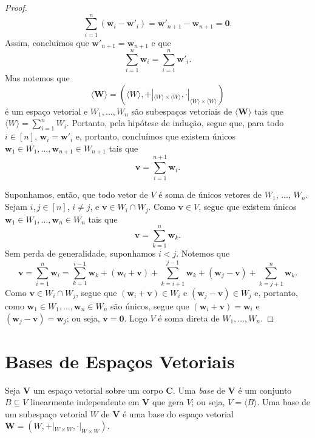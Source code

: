 \begin{proof}
\begin{equation*}
	\sum_{i=1}^n (\bm w_i - \bm w'_i) = \bm w'_{n+1} - \bm w_{n+1} = \bm 0.
	\end{equation*}
Assim, concluímos que $\bm w'_{n+1}=\bm w_{n+1}$ e que
	\begin{equation*}
	\sum_{i=1}^n \bm w_i = \sum_{i=1}^n \bm w'_i.
	\end{equation*}
Mas notemos que
	\begin{equation*}
	\bm{\langle W \rangle}=(\langle W \rangle,+|_{\langle W \rangle \times \langle W \rangle},\cdot|_{\langle W \rangle \times \langle W \rangle})
	\end{equation*}
é um espaço vetorial e $W_1,\ldots,W_n$ são subespaços vetoriais de $\bm{\langle W \rangle}$ tais que $\langle W \rangle=\displaystyle\sum_{i=1}^n W_i$. Portanto, pela hipótese de indução, segue que, para todo $i \in [n]$, $\bm w_i = \bm w'_i$ e, portanto, concluímos que existem únicos $\bm w_1 \in W_1,\ldots,\bm w_{n+1} \in W_{n+1}$ tais que
	\begin{equation*}
	\bm v = \sum_{i=1}^{n+1} \bm w_i.
	\end{equation*}

	Suponhamos, então, que todo vetor de $V$ é soma de únicos vetores de $W_1$, $\ldots$, $W_n$. Sejam $i,j \in [n]$, $i \neq j$, e $\bm v \in W_i \cap W_j$. Como $\bm v \in V$, segue que existem únicos $\bm w_1 \in W_1, \ldots, \bm w_n \in W_n$ tais que
	\begin{equation*}
	\bm v = \sum_{k=1}^n \bm w_k.
	\end{equation*}
Sem perda de generalidade, suponhamos $i<j$. Notemos que
	\begin{equation*}
	\bm v = \sum_{i=1}^n \bm w_i = \sum_{k=1}^{i-1} \bm w_k + (\bm w_i+\bm v) +  \sum_{k=i+1}^{j-1} \bm w_k + (\bm w_j - \bm v) + \sum_{k=j+1}^n \bm w_k.
	\end{equation*}
Como $\bm v \in W_i \cap W_j$, segue que $(\bm w_i+\bm v) \in W_i$ e $(\bm w_j - \bm v) \in W_j$ e, portanto, como $\bm w_1 \in W_1, \ldots, \bm w_n \in W_n$ são únicos, segue que $(\bm w_i+\bm v) = \bm w_i$ e $(\bm w_j - \bm v) = \bm w_j$; ou seja, $\bm v = \bm 0$. Logo $V$ é soma direta de $W_1,\ldots,W_n$.
\end{proof}


\section{Bases de Espaços Vetoriais}

\begin{defi}
	Seja $\bm V$ um espaço vetorial sobre um corpo $\bm C$. Uma \emph{base} de $\bm V$ é um conjunto $B \subseteq V$ linearmente independente em $\bm V$ que gera $V$; ou seja, $V=\langle B \rangle$. Uma base de um subespaço vetorial $W$ de $\bm V$ é uma base do espaço vetorial $\bm W=(W,+|_{W \times W},\cdot|_{W \times W})$.
\end{defi}

